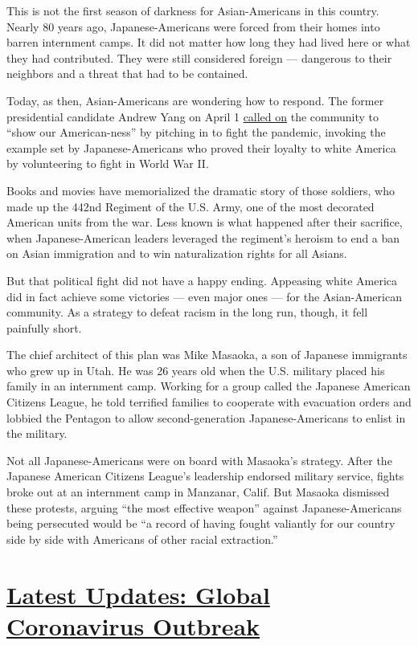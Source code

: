 This is not the first season of darkness for Asian-Americans in this
country. Nearly 80 years ago, Japanese-Americans were forced from their
homes into barren internment camps. It did not matter how long they had
lived here or what they had contributed. They were still considered
foreign --- dangerous to their neighbors and a threat that had to be
contained.

Today, as then, Asian-Americans are wondering how to respond. The former
presidential candidate Andrew Yang on April 1
\href{https://www.washingtonpost.com/opinions/2020/04/01/andrew-yang-coronavirus-discrimination/}{called
on} the community to ``show our American-ness'' by pitching in to fight
the pandemic, invoking the example set by Japanese-Americans who proved
their loyalty to white America by volunteering to fight in World War II.

Books and movies have memorialized the dramatic story of those soldiers,
who made up the 442nd Regiment of the U.S. Army, one of the most
decorated American units from the war. Less known is what happened after
their sacrifice, when Japanese-American leaders leveraged the regiment's
heroism to end a ban on Asian immigration and to win naturalization
rights for all Asians.

But that political fight did not have a happy ending. Appeasing white
America did in fact achieve some victories --- even major ones --- for
the Asian-American community. As a strategy to defeat racism in the long
run, though, it fell painfully short.

The chief architect of this plan was Mike Masaoka, a son of Japanese
immigrants who grew up in Utah. He was 26 years old when the U.S.
military placed his family in an internment camp. Working for a group
called the Japanese American Citizens League, he told terrified families
to cooperate with evacuation orders and lobbied the Pentagon to allow
second-generation Japanese-Americans to enlist in the military.

Not all Japanese-Americans were on board with Masaoka's strategy. After
the Japanese American Citizens League's leadership endorsed military
service, fights broke out at an internment camp in Manzanar, Calif. But
Masaoka dismissed these protests, arguing ``the most effective weapon''
against Japanese-Americans being persecuted would be ``a record of
having fought valiantly for our country side by side with Americans of
other racial extraction.''

\hypertarget{latest-updates-global-coronavirus-outbreak}{%
\section{\texorpdfstring{\href{https://www.nytimes.com/2020/08/01/world/coronavirus-covid-19.html?action=click\&pgtype=Article\&state=default\&region=MAIN_CONTENT_1\&context=storylines_live_updates}{Latest
Updates: Global Coronavirus
Outbreak}}{Latest Updates: Global Coronavirus Outbreak}}\label{latest-updates-global-coronavirus-outbreak}}


